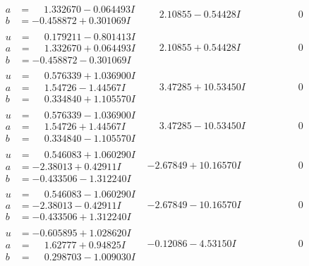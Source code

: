 \documentclass[1p]{elsarticle_modified}
\theoremstyle{definition}
\begin{document}
$$\begin{array}{c|c|c}
\begin{aligned}
a &= \phantom{-}1.332670 - 0.064493 I \\
b &= -0.458872 + 0.301069 I\end{aligned}
 & \phantom{-}2.10855 - 0.54428 I & \phantom{-0.000000 } 0 \\ \hline\begin{aligned}
u &= \phantom{-}0.179211 - 0.801413 I \\
a &= \phantom{-}1.332670 + 0.064493 I \\
b &= -0.458872 - 0.301069 I\end{aligned}
 & \phantom{-}2.10855 + 0.54428 I & \phantom{-0.000000 } 0 \\ \hline\begin{aligned}
u &= \phantom{-}0.576339 + 1.036900 I \\
a &= \phantom{-}1.54726 - 1.44567 I \\
b &= \phantom{-}0.334840 + 1.105570 I\end{aligned}
 & \phantom{-}3.47285 + 10.53450 I & \phantom{-0.000000 } 0 \\ \hline\begin{aligned}
u &= \phantom{-}0.576339 - 1.036900 I \\
a &= \phantom{-}1.54726 + 1.44567 I \\
b &= \phantom{-}0.334840 - 1.105570 I\end{aligned}
 & \phantom{-}3.47285 - 10.53450 I & \phantom{-0.000000 } 0 \\ \hline\begin{aligned}
u &= \phantom{-}0.546083 + 1.060290 I \\
a &= -2.38013 + 0.42911 I \\
b &= -0.433506 - 1.312240 I\end{aligned}
 & -2.67849 + 10.16570 I & \phantom{-0.000000 } 0 \\ \hline\begin{aligned}
u &= \phantom{-}0.546083 - 1.060290 I \\
a &= -2.38013 - 0.42911 I \\
b &= -0.433506 + 1.312240 I\end{aligned}
 & -2.67849 - 10.16570 I & \phantom{-0.000000 } 0 \\ \hline\begin{aligned}
u &= -0.605895 + 1.028620 I \\
a &= \phantom{-}1.62777 + 0.94825 I \\
b &= \phantom{-}0.298703 - 1.009030 I\end{aligned}
 & -0.12086 - 4.53150 I & \phantom{-0.000000 } 0 \\ \hline\begin{aligned}

\end{aligned}
\end{array}$$
\end{document}
